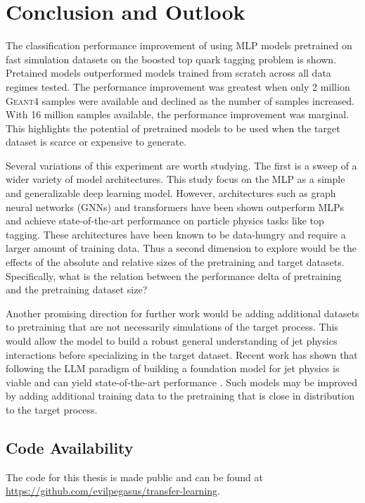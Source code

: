\chapter{Conclusion and Outlook}

The classification performance improvement of using MLP models pretrained on fast simulation datasets on the boosted top quark tagging problem is shown. Pretained models outperformed models trained from scratch across all data regimes tested. The performance improvement was greatest when only 2 million \textsc{Geant4} samples were available and declined as the number of samples increased. With 16 million samples available, the performance improvement was marginal. This highlights the potential of pretrained models to be used when the target dataset is scarce or expensive to generate.

Several variations of this experiment are worth studying. The first is a sweep of a wider variety of model architectures. This study focus on the MLP as a simple and generalizable deep learning model. However, architectures such as graph neural networks (GNNs) and transformers have been shown outperform MLPs and achieve state-of-the-art performance on particle physics tasks like top tagging. These architectures have been known to be data-hungry and require a larger amount of training data. Thus a second dimension to explore would be the effects of the absolute and relative sizes of the pretraining and target datasets. Specifically, what is the relation between the performance delta of pretraining and the pretraining dataset size?

Another promising direction for further work would be adding additional datasets to pretraining that are not necessarily simulations of the target process. This would allow the model to build a robust general understanding of jet physics interactions before specializing in the target dataset. Recent work has shown that following the LLM paradigm of building a foundation model for jet physics is viable and can yield state-of-the-art performance \cite{mikuni2024omnilearn}. Such models may be improved by adding additional training data to the pretraining that is close in distribution to the target process.

\section{Code Availability}
The code for this thesis is made public and can be found at \href{https://github.com/evilpegasus/transfer-learning}{https://github.com/evilpegasus/transfer-learning}.

